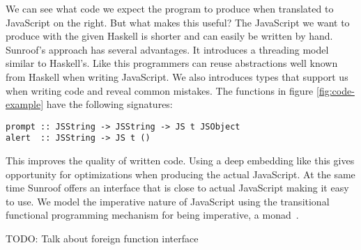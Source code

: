 We can see what code we expect the program to produce when 
translated to JavaScript on the right. But what makes 
this useful? The JavaScript we want to produce with the given
Haskell is shorter and can easily be written by hand.
Sunroof's approach has several advantages. It introduces a 
threading model similar
to Haskell's. Like this programmers can reuse abstractions
well known from Haskell when writing JavaScript.
We also introduces types that support us when 
writing code and reveal common mistakes. The functions
in figure \ref{fig:code-example} have the following signatures:
\begin{verbatim}
prompt :: JSString -> JSString -> JS t JSObject
alert  :: JSString -> JS t ()
\end{verbatim}
This improves the quality of written code.
Using a deep embedding like this gives opportunity 
for optimizations when producing the actual JavaScript.
At the same time Sunroof offers an interface that is 
close to actual JavaScript making it easy to use.
We model the imperative nature of JavaScript
using the transitional functional programming 
mechanism for being imperative, a monad~\cite{Moggi:91:ComputationMonads}.

TODO: Talk about foreign function interface


